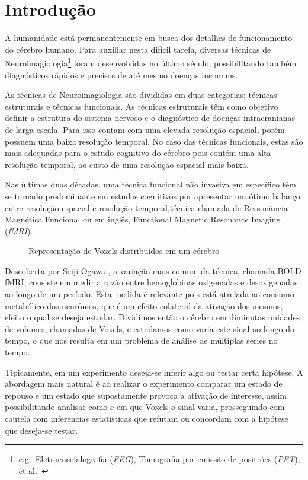 \documentclass[11pt,a4paper]{report}
\begin{document}

\titleGP
\newpage
\section*{Introdução}
A humanidade está permanentemente em busca dos detalhes de funcionamento do cérebro humano. Para auxiliar nesta difícil tarefa, diversas técnicas de Neuroimagiologia\footnote{e.g.\ Eletroencefalografia (\emph{EEG}), Tomografia por emissão de positrões (\emph{PET}), et al.\ } foram desenvolvidas no último século, possibilitando também diagnósticos rápidos e precisos de até mesmo doenças incomuns.

As técnicas de Neuroimagiologia são divididas em duas categorias; técnicas estruturais e técnicas funcionais. As técnicas estruturais têm como objetivo definir a estrutura do sistema nervoso e o diagnóstico de doenças intracranianas de larga escala. Para isso contam com uma elevada resolução espacial, porém possuem uma baixa resolução temporal. No caso das técnicas funcionais, estas são mais adequadas para o estudo cognitivo do cérebro pois contém uma alta resolução temporal, ao custo de uma resolução espacial mais baixa.


Nas últimas duas décadas, uma técnica funcional não invasiva em específico têm se tornado predominante em estudos cognitivos por apresentar um ótimo balanço entre resolução espacial e resolução temporal,técnica chamada de Ressonância Magnética Funcional ou em inglês, Functional Magnetic Resonance Imaging (\emph{fMRI}). 
\begin{figure}[htpb]
  \centering
  
  \caption{Representação de Voxels distribuídos em um cérebro}
  \label{fig:1}
\end{figure}

Descoberta por Seiji Ogawa \cite{ogawa1990brain}, a variação mais comum da técnica, chamada BOLD fMRI, consiste em medir a razão entre hemoglobinas oxigenadas e desoxigenadas ao longo de um período. Esta medida é relevante pois está atrelada ao consumo metabólico dos neurônios, que é um efeito colateral da ativação dos mesmos, efeito o qual se deseja estudar. Dividimos então o cérebro em diminutas unidades de volumes, chamadas de Voxels, e estudamos como varia este sinal ao longo do tempo, o que nos resulta em um problema de análise de múltiplas séries no tempo.

Tipicamente, em um experimento deseja-se inferir algo ou testar certa hipótese. A abordagem mais natural é ao realizar o experimento comparar um estado de repouso e um estado que supostamente provoca a ativação de interesse, assim possibilitando analisar como e em que Voxels o sinal varia, prosseguindo com cautela com inferências estatísticas que refutam ou concordam com a hipótese que deseja-se testar.
\end{document}

